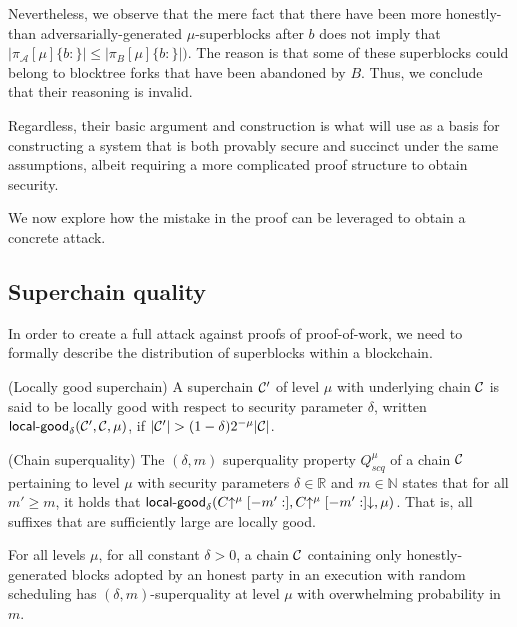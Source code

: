 Nevertheless, we observe that the mere fact that there have been more honestly-
than adversarially-generated $\mu$-superblocks after $b$ does not imply that
$|\pi_\mathcal{A}[\mu]\{b:\}| \leq |\pi_B[\mu]\{b:\}|)$. The reason is that some
of these superblocks could belong to blocktree forks that have been abandoned by
$B$. Thus, we conclude that their reasoning is invalid.

Regardless, their basic argument and construction is what will use as a basis
for constructing a system that is both provably secure and succinct under the
same assumptions, albeit requiring a more complicated proof structure to obtain
security.

We now explore how the mistake in the proof can be leveraged to obtain a concrete attack.

\subsection{Superchain quality}

In order to create a full attack against proofs of proof-of-work, we need to
formally describe the distribution of superblocks within a blockchain.

\begin{definition}{(Locally good superchain)}
A superchain $\mathcal{C}'$ of level
$\mu$ with underlying chain $\mathcal{C}$ is said to be \textnormal{locally good}
with respect to security parameter $\delta$, written
$\textsf{local-good}_{\delta}(\mathcal{C}', \mathcal{C}, \mu)$, if $|\mathcal{C}'| > (1 -
\delta)2^{-\mu}|\mathcal{C}|$.
\end{definition}

\begin{definition}{(Chain superquality)}
The $(\delta, m)$ superquality property
$Q^\mu_{scq}$ of a chain $\mathcal{C}$ pertaining to level $\mu$ with security
parameters $\delta \in \mathbb{R}$ and $m \in \mathbb{N}$ states that for all
$m' \geq m$, it holds that $\textsf{local-good}_{\delta}(C\negthickspace\uparrow^\mu[-m':],
C\negthickspace\uparrow^\mu[-m':]\negthickspace\downarrow, \mu)$. That is, all suffixes that are
sufficiently large are locally good. \end{definition}

\begin{lemma}
For all levels $\mu$, for all constant $\delta > 0$, a chain
$\mathcal{C}$ containing only honestly-generated blocks adopted by an honest party in
an execution with random scheduling has $(\delta, m)$-superquality at level
$\mu$ with overwhelming probability in $m$.
\end{lemma}

